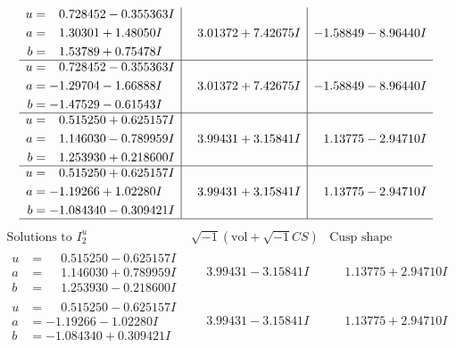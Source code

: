 \documentclass[1p]{elsarticle_modified}
\theoremstyle{definition}
\newcommand{\I}{\sqrt{-1}}
\begin{document}
$$\begin{array}{c|c|c}
\begin{aligned}
u &= \phantom{-}0.728452 - 0.355363 I \\
a &= \phantom{-}1.30301 + 1.48050 I \\
b &= \phantom{-}1.53789 + 0.75478 I\end{aligned}
 & \phantom{-}3.01372 + 7.42675 I & -1.58849 - 8.96440 I \\ \hline\begin{aligned}
u &= \phantom{-}0.728452 - 0.355363 I \\
a &= -1.29704 - 1.66888 I \\
b &= -1.47529 - 0.61543 I\end{aligned}
 & \phantom{-}3.01372 + 7.42675 I & -1.58849 - 8.96440 I \\ \hline\begin{aligned}
u &= \phantom{-}0.515250 + 0.625157 I \\
a &= \phantom{-}1.146030 - 0.789959 I \\
b &= \phantom{-}1.253930 + 0.218600 I\end{aligned}
 & \phantom{-}3.99431 + 3.15841 I & \phantom{-}1.13775 - 2.94710 I \\ \hline\begin{aligned}
u &= \phantom{-}0.515250 + 0.625157 I \\
a &= -1.19266 + 1.02280 I \\
b &= -1.084340 - 0.309421 I\end{aligned}
 & \phantom{-}3.99431 + 3.15841 I & \phantom{-}1.13775 - 2.94710 I\\
 \hline 
 \end{array}$$\newpage$$\begin{array}{c|c|c}  
\text{Solutions to }I^u_{2}& \I (\text{vol} + \sqrt{-1}CS) & \text{Cusp shape}\\
 \hline 
\begin{aligned}
u &= \phantom{-}0.515250 - 0.625157 I \\
a &= \phantom{-}1.146030 + 0.789959 I \\
b &= \phantom{-}1.253930 - 0.218600 I\end{aligned}
 & \phantom{-}3.99431 - 3.15841 I & \phantom{-}1.13775 + 2.94710 I \\ \hline\begin{aligned}
u &= \phantom{-}0.515250 - 0.625157 I \\
a &= -1.19266 - 1.02280 I \\
b &= -1.084340 + 0.309421 I\end{aligned}
 & \phantom{-}3.99431 - 3.15841 I & \phantom{-}1.13775 + 2.94710 I \\ \hline\begin{aligned}

\end{aligned}
\end{array}$$
\end{document}
